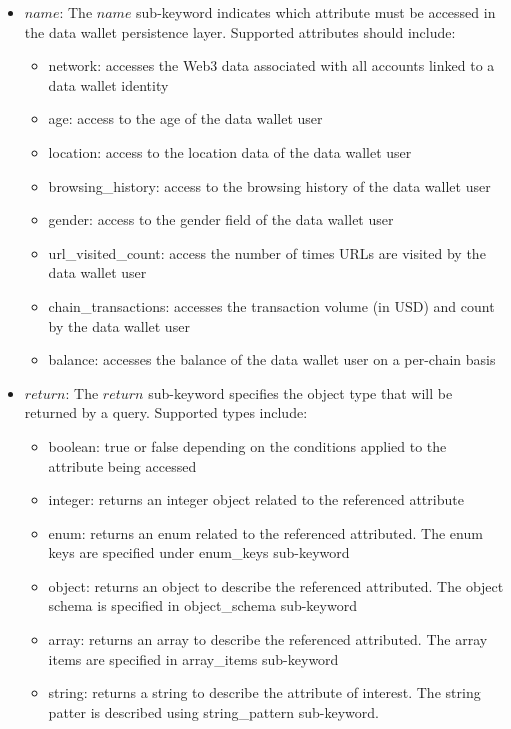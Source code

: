 \begin{itemize}
    \item $name$: The $name$ sub-keyword indicates which attribute must be accessed in the data wallet persistence layer. Supported attributes should include:
    \begin{itemize}
        \item network: accesses the Web3 data associated with all accounts linked to a data wallet identity
        \item age: access to the age of the data wallet user
        \item location: access to the location data of the data wallet user
        \item browsing\_history: access to the browsing history of the data wallet user
        \item gender: access to the gender field of the data wallet user
        \item url\_visited\_count: access the number of times URLs are visited by the data wallet user
        \item chain\_transactions: accesses the transaction volume (in USD) and count by the data wallet user
        \item balance: accesses the balance of the data wallet user on a per-chain basis
    \end{itemize}
    \item $return$: The $return$ sub-keyword specifies the object type that will be returned by a query. Supported types include:
    \begin{itemize}
        \item boolean: true or false depending on the conditions applied to the attribute being accessed
        \item integer: returns an integer object related to the referenced attribute
        \item enum: returns an enum related to the referenced attributed. The enum keys are specified under enum\_keys sub-keyword
        \item object: returns an object to describe the referenced attributed. The object schema is specified in object\_schema sub-keyword
        \item array: returns an array to describe the referenced attributed. The array items are specified in array\_items sub-keyword
        \item string: returns a string to describe the attribute of interest. The string patter is described using string\_pattern sub-keyword.

\end{itemize}
\end{itemize}
